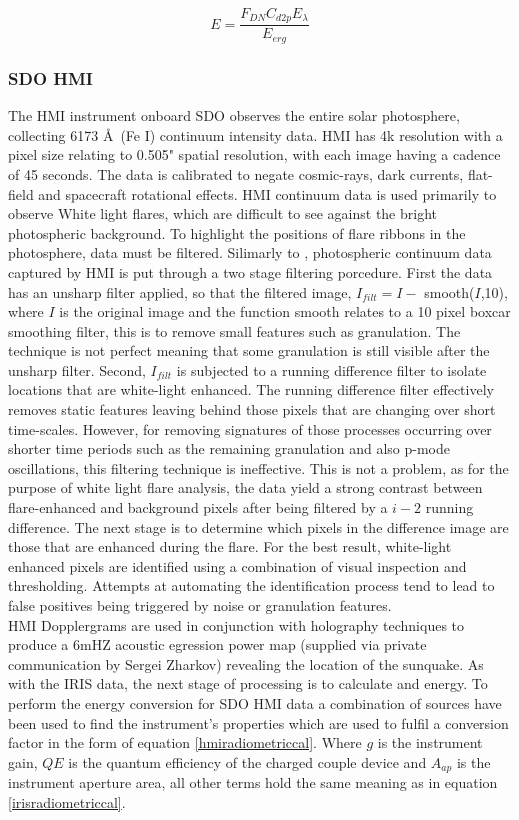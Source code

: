 \begin{equation}\label{irisradiometriccal}
E = \frac{F_{DN}  C_{d2p} E_{\lambda}}{E_{erg}}
\end{equation}


\subsubsection{SDO HMI}
The HMI instrument onboard SDO observes the entire solar photosphere, collecting 6173 \AA\ (Fe I) continuum intensity data. HMI has 4k resolution with a pixel size relating to 0.505" spatial resolution, with each image having a cadence of 45 seconds. The data is calibrated to negate cosmic-rays, dark currents, flat-field and spacecraft rotational effects. HMI continuum data is used primarily to observe White light flares, which are difficult to see against the bright photospheric background. To highlight the positions of flare ribbons in the photosphere, data must be filtered. Silimarly to \cite{2014ApJ...783...98K}, photospheric continuum data captured by HMI is put through a two stage filtering porcedure. First the data has an unsharp filter applied, so that the filtered image, $I_{filt}=I-$ smooth($I$,10), where $I$ is the original image and the function smooth relates to a 10 pixel boxcar smoothing filter, this is to remove small features such as granulation. The technique is not perfect meaning that some granulation is still visible after the unsharp filter. Second, $I_{filt}$ is subjected to a running difference filter to isolate locations that are white-light enhanced. The running difference filter effectively removes static features leaving behind those pixels that are changing over short time-scales. However, for removing signatures of those processes occurring over shorter time periods such as the remaining granulation and also p-mode oscillations, this filtering technique is ineffective. This is not a problem, as for the purpose of white light flare analysis, the data yield a strong contrast between flare-enhanced and background pixels after being filtered by a $i-2$ running difference. The next stage is to determine which pixels in the difference image are those that are enhanced during the flare. For the best result, white-light enhanced pixels are identified using a combination of visual inspection and thresholding. Attempts at automating the identification process tend to lead to false positives being triggered by noise or granulation features. \\
HMI Dopplergrams are used in conjunction with holography techniques to produce a 6mHZ acoustic egression power map (supplied via private communication by Sergei Zharkov) revealing the location of the sunquake. 
As with the IRIS data, the next stage of processing is to calculate and energy. To perform the energy conversion for SDO HMI data a combination of sources \citep{2012SoPh..275...41B, 2012SoPh..275..285C} have been used to find the instrument's properties which are used to fulfil a conversion factor in the form of equation \ref{hmiradiometriccal}. Where $g$ is the instrument gain, $QE$ is the quantum efficiency of the charged couple device and $A_{ap}$ is the instrument aperture area, all other terms hold the same meaning as in equation \ref{irisradiometriccal}.

